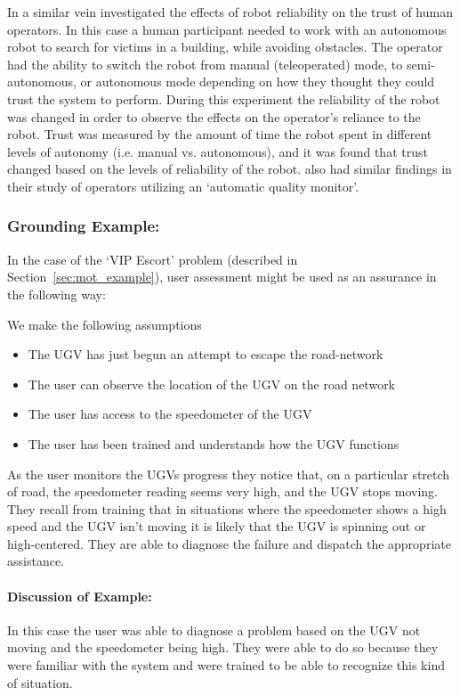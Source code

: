 In a similar vein \citet{Desai2012-rc} investigated the effects of robot reliability on the trust of human operators. In this case a human participant needed to work with an autonomous robot to search for victims in a building, while avoiding obstacles. The operator had the ability to switch the robot from manual (teleoperated) mode, to semi-autonomous, or autonomous mode depending on how they thought they could trust the system to perform. During this experiment the reliability of the robot was changed in order to observe the effects on the operator's reliance to the robot. Trust was measured by the amount of time the robot spent in different levels of autonomy (i.e. manual vs. autonomous), and it was found that trust changed based on the levels of reliability of the robot. \citet{Yu2018-qw} also had similar findings in their study of operators utilizing an `automatic quality monitor'.

\subsubsection{Grounding Example:}
In the case of the `VIP Escort' problem (described in Section~\ref{sec:mot_example}), user assessment might be used as an assurance in the following way:

We make the following assumptions

\begin{itemize}
    \item The UGV has just begun an attempt to escape the road-network
    \item The user can observe the location of the UGV on the road network
    \item The user has access to the speedometer of the UGV
    \item The user has been trained and understands how the UGV functions
\end{itemize}

As the user monitors the UGVs progress they notice that, on a particular stretch of road, the speedometer reading seems very high, and the UGV stops moving. They recall from training that in situations where the speedometer shows a high speed and the UGV isn't moving it is likely that the UGV is spinning out or high-centered. They are able to diagnose the failure and dispatch the appropriate assistance.

\paragraph{\textbf{Discussion of Example:}} In this case the user was able to diagnose a problem based on the UGV not moving and the speedometer being high. They were able to do so because they were familiar with the system and were trained to be able to recognize this kind of situation.
